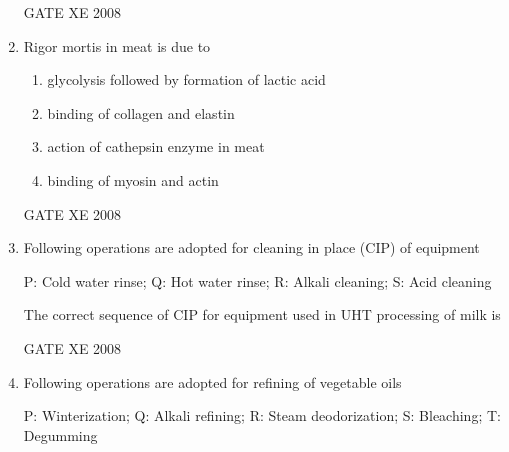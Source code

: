 \documentclass[12pt]{article}
\begin{document}
\begin{enumerate}[label=Q\arabic*.]
\begin{enumerate}[label=(\Alph*)]
\end{enumerate}

GATE XE 2008  

\item Rigor mortis in meat is due to  

\begin{enumerate}[label=(\Alph*)]
\item  glycolysis followed by formation of lactic acid  
\item  binding of collagen and elastin  
\item  action of cathepsin enzyme in meat  
\item  binding of myosin and actin  
\end{enumerate}

GATE XE 2008  

\item Following operations are adopted for cleaning in place (CIP) of equipment  

P: Cold water rinse; Q: Hot water rinse; R: Alkali cleaning; S: Acid cleaning  

The correct sequence of CIP for equipment used in UHT processing of milk is  

\begin{enumerate}[label=(\Alph*)]
\end{enumerate}

GATE XE 2008  

\item Following operations are adopted for refining of vegetable oils  

P: Winterization; Q: Alkali refining; R: Steam deodorization; S: Bleaching; T: Degumming  


\end{enumerate}
\end{document}
